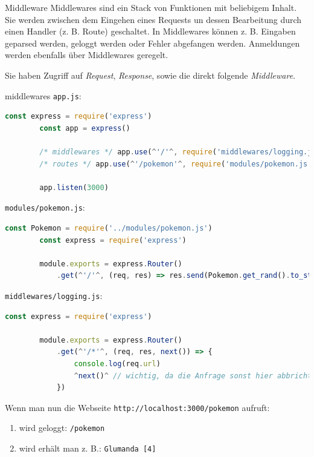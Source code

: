 \begin{defi}{Middleware}
    Middlewares sind ein Stack von Funktionen mit beliebigem Inhalt.
    Sie werden zwischen dem Eingehen eines Requests un dessen Bearbeitung durch einen Handler (z. B. Route) geschaltet.
    In Middlewares können z. B. Eingaben geparsed werden, geloggt werden oder Fehler abgefangen werden.
    Anmeldungen werden ebenfalls über Middlewares geregelt.

    Sie haben Zugriff auf \emph{Request}, \emph{Response}, sowie die direkt folgende \emph{Middleware}.
\end{defi}

\begin{example}{middlewares}
    \texttt{app.js}:
    \begin{lstlisting}[language=JavaScript]
        const express = require('express')
        const app = express()

        /* middlewares */ app.use(^'/'^, require('middlewares/logging.js')) // 1.
        /* routes */ app.use(^'/pokemon'^, require('modules/pokemon.js')) // 2.

        app.listen(3000)
    \end{lstlisting}

    \texttt{modules/pokemon.js}:
    \begin{lstlisting}[language=JavaScript]
        const Pokemon = require('../modules/pokemon.js')
        const express = require('express')
        
        module.exports = express.Router()
            .get(^'/'^, (req, res) => res.send(Pokemon.get_rand().to_string()) )
    \end{lstlisting}

    \texttt{middlewares/logging.js}:
    \begin{lstlisting}[language=JavaScript]
        const express = require('express')
        
        module.exports = express.Router()
            .get(^'/*'^, (req, res, next()) => {
                console.log(req.url)
                ^next()^ // wichtig, da die Anfrage sonst hier abbricht
            })
    \end{lstlisting}

    Wenn man nun die Webseite \texttt{http://localhost:3000/pokemon} aufruft:
    \begin{enumerate}
        \item wird geloggt: \texttt{/pokemon}
        \item wird erhält man z. B.: \texttt{Glumanda [4]}
    \end{enumerate}
\end{example}

